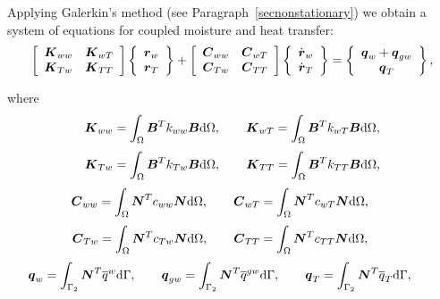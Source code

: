 Applying Galerkin's method (see Paragraph~\ref{secnonstationary}) we obtain a system of equations 
for coupled moisture and heat transfer:
\begin{eqnarray}\label{final_eq}
\left[ \begin{array}{cc}
\mbox{\boldmath$K$}_{ww} & \mbox{\boldmath$K$}_{wT} \\
\mbox{\boldmath$K$}_{Tw} & \mbox{\boldmath$K$}_{TT}
\end{array} \right]
\left\{ \begin{array}{c}
\mbox{\boldmath$r$}_w \\
\mbox{\boldmath$r$}_{T}
\end{array} \right\} + 
\left[ \begin{array}{cc}
\mbox{\boldmath$C$}_{ww} & \mbox{\boldmath$C$}_{wT} \\
\mbox{\boldmath$C$}_{Tw} & \mbox{\boldmath$C$}_{TT}
\end{array} \right]
\left\{ \begin{array}{c}
\dot{\mbox{\boldmath$r$}}_w \\
\dot{\mbox{\boldmath$r$}}_{T}
\end{array} \right\} = 
\left\{ \begin{array}{c}
\mbox{\boldmath$q$}_{w} + \mbox{\boldmath$q$}_{gw} \\
\mbox{\boldmath$q$}_{T}
\end{array} \right\},
\end{eqnarray}

where
\begin{eqnarray}
\mbox{\boldmath$K$}_{ww} = \int_{\Omega} \mbox{\boldmath$B$}^T k_{ww} \mbox{\boldmath$B$}{\rm d}\Omega,
\qquad \mbox{\boldmath$K$}_{wT} = \int_{\Omega} \mbox{\boldmath$B$}^T k_{wT} \mbox{\boldmath$B$}{\rm d}\Omega,
\end{eqnarray}
\begin{eqnarray}
\mbox{\boldmath$K$}_{Tw} = \int_{\Omega} \mbox{\boldmath$B$}^T k_{Tw} \mbox{\boldmath$B$}{\rm d}\Omega,
\qquad \mbox{\boldmath$K$}_{TT} = \int_{\Omega} \mbox{\boldmath$B$}^T k_{TT} \mbox{\boldmath$B$}{\rm d}\Omega,
\end{eqnarray}
\begin{eqnarray}
\mbox{\boldmath$C$}_{ww} = \int_{\Omega} \mbox{\boldmath$N$}^T c_{ww}  \mbox{\boldmath$N$} {\rm d}\Omega,\qquad
\mbox{\boldmath$C$}_{wT} = \int_{\Omega} \mbox{\boldmath$N$}^T c_{wT}  \mbox{\boldmath$N$} {\rm d}\Omega,\qquad
\end{eqnarray}
\begin{eqnarray}
\mbox{\boldmath$C$}_{Tw} = \int_{\Omega} \mbox{\boldmath$N$}^T c_{Tw}  \mbox{\boldmath$N$} {\rm d}\Omega,\qquad
\mbox{\boldmath$C$}_{TT} = \int_{\Omega} \mbox{\boldmath$N$}^T c_{TT}  \mbox{\boldmath$N$} {\rm d}\Omega,\qquad
\end{eqnarray}
\begin{eqnarray}
\mbox{\boldmath$q$}_w = \int_{\Gamma_2} \mbox{\boldmath$N$}^T  \overline{q}^{w}{\rm d}\Gamma,\qquad
\mbox{\boldmath$q$}_{gw} = \int_{\Gamma_2} \mbox{\boldmath$N$}^T  \overline{q}^{gw}{\rm d}\Gamma,\qquad
\mbox{\boldmath$q$}_T = \int_{\Gamma_2} \mbox{\boldmath$N$}^T  \overline{q}_{T}{\rm d}\Gamma,\qquad
\end{eqnarray}

